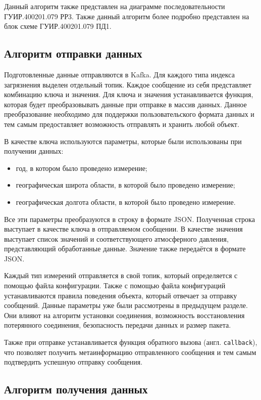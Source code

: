 Данный алгоритм также представлен на диаграмме последовательности ГУИР.400201.079 РР3.
Также данный алгоритм  более подробно представлен на блок схеме ГУИР.400201.079 ПД1.


\subsection{Алгоритм отправки данных}

Подготовленные данные отправляются в Kafka.
Для каждого типа индекса загрязнения выделен отдельный топик.
Каждое сообщение из себя представляет комбинацию ключа и значения.
Для ключа и значения устанавливается функция, которая будет преобразовывать данные при отправке в массив данных.
Данное преобразование необходимо для поддержки пользовательского формата данных и тем самым предоставляет возможность отправлять и хранить любой объект.

В качестве ключа используются параметры, которые были использованы при получении данных:
\begin{itemize}
    \item год, в котором было проведено измерение;
    \item географическая широта области, в которой было проведено измерение;
    \item географическая долгота области, в которой было проведено измерение.
\end{itemize}

Все эти параметры преобразуются в строку в формате JSON.
Полученная строка выступает в качестве ключа в отправляемом сообщении.
В качестве значения выступает список значений и соответствующего атмосферного давления, представляющий обработанные данные.
Значение также передаётся в формате JSON.

Каждый тип измерений отправляется в свой топик, который определяется с помощью файла конфигурации.
Также с помощью файла конфигураций устанавливаются правила поведения объекта, который отвечает за отправку сообщений.
Данные параметры уже были рассмотрены в предыдущем разделе.
Они влияют на алгоритм установки соединения, возможность восстановления потерянного соединения, безопасность передачи данных и размер пакета.

Также при отправке устанавливается функция обратного вызова (англ. \texttt{callback}), что позволяет получить метаинформацию отправленного сообщения и тем самым подтвердить успешную отправку сообщения.

\subsection{Алгоритм получения данных}

